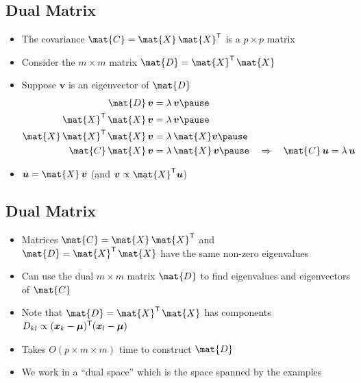 
\begin{slide}
\section[-2]{Dual Matrix}

\begin{PauseHighLight}
  \begin{itemize}
  \item The covariance $\mat{C} = \mat{X}\,\mat{X}^\tr$ is a $p\times p$
    matrix\pause
  \item Consider the $m\times m$ matrix $\mat{D} =
    \mat{X}^\tr\,\mat{X}$\pause 
  \item Suppose $\bm{v}$ is an eigenvector of $\mat{D}$
    \begin{align*}
      \mat{D}\, \bm{v} &= \lambda\, \bm{v}\pause
      \\
      \mat{X}^\tr\,\mat{X}\,\bm{v} &= \lambda\, \bm{v}\pause
      \\
      \mat{X} \, \mat{X}^\tr\,\mat{X}\,\bm{v} &= \lambda\, \mat{X}
      \bm{v}\pause
      \\
      \mat{C}\,\mat{X}\,\bm{v} &= \lambda\, \mat{X}\,\bm{v}\pause 
                                 \quad \Rightarrow
      \quad \mat{C} \,\bm{u} = \lambda \, \bm{u}
    \end{align*}
  \item $\bm{u} = \mat{X}\,\bm{v}$\pause{} (and $\bm{v} \propto
    \mat{X}^\tr \bm{u}$)\pauseb
  \end{itemize}
\end{PauseHighLight}

\end{slide}


\begin{slide}
\section{Dual Matrix}

\begin{PauseHighLight}
  \begin{itemize}
  \item Matrices $\mat{C} = \mat{X}\,\mat{X}^\tr$ and $\mat{D} =
    \mat{X}^\tr\,\mat{X}$ have the same non-zero eigenvalues\pause
  \item Can use the dual $m\times m$ matrix $\mat{D}$ to find eigenvalues
    and eigenvectors of $\mat{C}$\pause
  \item Note that $\mat{D} = \mat{X}^\tr\,\mat{X}$ has components
    $D_{kl} \propto (\bm{x}_k -\bm{\mu})^{\textsf{T}} (\bm{x}_l -\bm{\mu})$\pause
  \item Takes $O(p\times m \times m)$ time to construct $\mat{D}$\pause
  \item We work in a ``dual space'' which is the space spanned by the examples\pause
  \end{itemize}
\end{PauseHighLight}

\end{slide}

